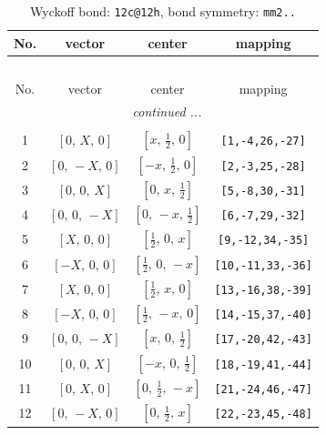 \documentclass[fleqn,8pt]{jsarticle}
\begin{document}
\renewcommand{\arraystretch}{1.2}
\begin{longtable}{cccc}
\caption{Wyckoff bond: {\tt 12c@12h}, bond symmetry: {\tt mm2..}}
 \\
 \hline \hline
No. & vector & center & mapping \\ \hline \endfirsthead

\multicolumn{3}{l}{\tablename\ \thetable{}} \\
 \hline \hline
No. & vector & center & mapping \\ \hline \endhead

 \hline \hline
\multicolumn{3}{r}{\footnotesize\it continued ...} \\ \endfoot

 \hline \hline
\multicolumn{3}{r}{} \\ \endlastfoot

1 & $\left[ 0,\, X,\, 0 \right]$ & $\left[ x,\, \frac{1}{2},\, 0 \right]$ & {\tt [1,-4,26,-27]} \\ \hline
2 & $\left[ 0,\, - X,\, 0 \right]$ & $\left[ - x,\, \frac{1}{2},\, 0 \right]$ & {\tt [2,-3,25,-28]} \\ \hline
3 & $\left[ 0,\, 0,\, X \right]$ & $\left[ 0,\, x,\, \frac{1}{2} \right]$ & {\tt [5,-8,30,-31]} \\ \hline
4 & $\left[ 0,\, 0,\, - X \right]$ & $\left[ 0,\, - x,\, \frac{1}{2} \right]$ & {\tt [6,-7,29,-32]} \\ \hline
5 & $\left[ X,\, 0,\, 0 \right]$ & $\left[ \frac{1}{2},\, 0,\, x \right]$ & {\tt [9,-12,34,-35]} \\ \hline
6 & $\left[ - X,\, 0,\, 0 \right]$ & $\left[ \frac{1}{2},\, 0,\, - x \right]$ & {\tt [10,-11,33,-36]} \\ \hline
7 & $\left[ X,\, 0,\, 0 \right]$ & $\left[ \frac{1}{2},\, x,\, 0 \right]$ & {\tt [13,-16,38,-39]} \\ \hline
8 & $\left[ - X,\, 0,\, 0 \right]$ & $\left[ \frac{1}{2},\, - x,\, 0 \right]$ & {\tt [14,-15,37,-40]} \\ \hline
9 & $\left[ 0,\, 0,\, - X \right]$ & $\left[ x,\, 0,\, \frac{1}{2} \right]$ & {\tt [17,-20,42,-43]} \\ \hline
10 & $\left[ 0,\, 0,\, X \right]$ & $\left[ - x,\, 0,\, \frac{1}{2} \right]$ & {\tt [18,-19,41,-44]} \\ \hline
11 & $\left[ 0,\, X,\, 0 \right]$ & $\left[ 0,\, \frac{1}{2},\, - x \right]$ & {\tt [21,-24,46,-47]} \\ \hline
12 & $\left[ 0,\, - X,\, 0 \right]$ & $\left[ 0,\, \frac{1}{2},\, x \right]$ & {\tt [22,-23,45,-48]} \\
\end{longtable}
\end{document}

